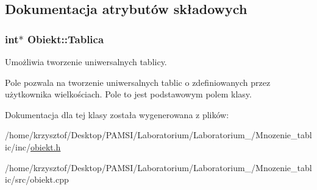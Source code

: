 \subsection{\-Dokumentacja atrybutów składowych}
\hypertarget{class_obiekt_a877ac2b65043327767012c184067f269}{
\subsubsection[{\-Tablica}]{\setlength{\rightskip}{0pt plus 5cm}int$\ast$ {\bf \-Obiekt\-::\-Tablica}}}\label{class_obiekt_a877ac2b65043327767012c184067f269}


\-Umożliwia tworzenie uniwersalnych tablicy. 

\-Pole pozwala na tworzenie uniwersalnych tablic o zdefiniowanych przez użytkownika wielkościach. \-Pole to jest podstawowym polem klasy. 

\-Dokumentacja dla tej klasy została wygenerowana z plików\-:\begin{DoxyCompactItemize}
\item 
/home/krzysztof/\-Desktop/\-P\-A\-M\-S\-I/\-Laboratorium/\-Laboratorium\-\_/\-Mnozenie\-\_\-tablic/inc/\hyperlink{obiekt_8h}{obiekt.\-h}\item 
/home/krzysztof/\-Desktop/\-P\-A\-M\-S\-I/\-Laboratorium/\-Laboratorium\-\_/\-Mnozenie\-\_\-tablic/src/obiekt.\-cpp\end{DoxyCompactItemize}
